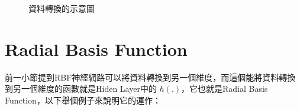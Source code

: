 \begin{figure}[htbp!]
	\centering


	\caption{資料轉換的示意圖}
\end{figure}



\section{Radial Basis Function}
前一小節提到RBF神經網路可以將資料轉換到另一個維度，而這個能將資料轉換到另一個維度的函數就是Hiden Layer中的 \(h(.)\)，它也就是Radial Basis Function，以下舉個例子來說明它的運作：

